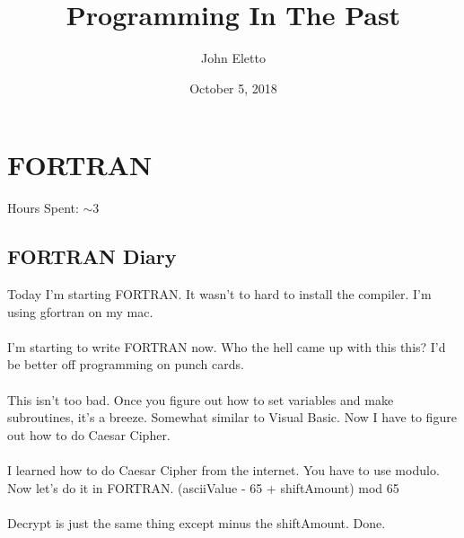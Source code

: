 \documentclass{report}
\title{Programming In The Past}
\author{John Eletto}
\date{October 5, 2018}
\begin{document}
\maketitle

\section*{FORTRAN}
Hours Spent: $\sim$3
\subsection*{FORTRAN Diary}
Today I'm starting FORTRAN. It wasn't to hard to install the compiler. I'm using gfortran on my mac.
\\
\\
I'm starting to write FORTRAN now. Who the hell came up with this this? I'd be better off programming on punch cards.
\\
\\
This isn't too bad. Once you figure out how to set variables and make subroutines, it's a breeze. Somewhat similar to Visual Basic. Now I have to figure out how to do Caesar Cipher.
\\
\\
I learned how to do Caesar Cipher from the internet. You have to use modulo. Now let's do it in FORTRAN. (asciiValue - 65 + shiftAmount) mod 65
\\
\\
Decrypt is just the same thing except minus the shiftAmount. Done.
\end{document}
